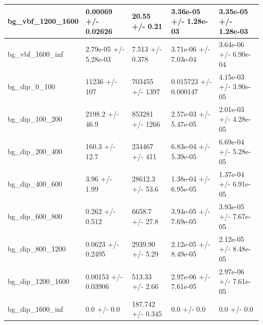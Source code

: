 \documentclass[a4paper, 10pt]{article}
\begin{document}
\begin{table}[H]
\begin{center}
\begin{tabular}{|m{20.0mm}|m{27.0mm}|m{27.0mm}|m{33.0mm}|m{32.0mm}|}
      \hline
      {\cellcolor{white}         bg\_vbf\_1200\_1600}& {\cellcolor{white}         0.00069 +/\-- 0.02626}& {\cellcolor{white}         20.55 +/\-- 0.21}& {\cellcolor{white}         3.36e-05 +/\-- 1.28e-03}& {\cellcolor{white}         3.35e-05 +/\-- 1.28e-03}\\
      \hline
      {\cellcolor{white}         bg\_vbf\_1600\_inf}& {\cellcolor{white}         2.79e-05 +/\-- 5.28e-03}& {\cellcolor{white}         7.513 +/\-- 0.378}& {\cellcolor{white}         3.71e-06 +/\-- 7.03e-04}& {\cellcolor{white}         3.64e-06 +/\-- 6.90e-04}\\
      \hline
      {\cellcolor{white}         bg\_dip\_0\_100}& {\cellcolor{white}         11236 +/\-- 107}& {\cellcolor{white}         703455 +/\-- 1397}& {\cellcolor{white}         0.015723 +/\-- 0.000147}& {\cellcolor{white}         4.15e-03 +/\-- 3.90e-05}\\
      \hline
      {\cellcolor{white}         bg\_dip\_100\_200}& {\cellcolor{white}         2198.2 +/\-- 46.9}& {\cellcolor{white}         853281 +/\-- 1266}& {\cellcolor{white}         2.57e-03 +/\-- 5.47e-05}& {\cellcolor{white}         2.01e-03 +/\-- 4.28e-05}\\
      \hline
      {\cellcolor{white}         bg\_dip\_200\_400}& {\cellcolor{white}         160.3 +/\-- 12.7}& {\cellcolor{white}         234467 +/\-- 411}& {\cellcolor{white}         6.83e-04 +/\-- 5.39e-05}& {\cellcolor{white}         6.69e-04 +/\-- 5.28e-05}\\
      \hline
      {\cellcolor{white}         bg\_dip\_400\_600}& {\cellcolor{white}         3.96 +/\-- 1.99}& {\cellcolor{white}         28612.3 +/\-- 53.6}& {\cellcolor{white}         1.38e-04 +/\-- 6.95e-05}& {\cellcolor{white}         1.37e-04 +/\-- 6.91e-05}\\
      \hline
      {\cellcolor{white}         bg\_dip\_600\_800}& {\cellcolor{white}         0.262 +/\-- 0.512}& {\cellcolor{white}         6658.7 +/\-- 27.8}& {\cellcolor{white}         3.94e-05 +/\-- 7.69e-05}& {\cellcolor{white}         3.93e-05 +/\-- 7.67e-05}\\
      \hline
      {\cellcolor{white}         bg\_dip\_800\_1200}& {\cellcolor{white}         0.0623 +/\-- 0.2495}& {\cellcolor{white}         2939.90 +/\-- 5.29}& {\cellcolor{white}         2.12e-05 +/\-- 8.49e-05}& {\cellcolor{white}         2.12e-05 +/\-- 8.48e-05}\\
      \hline
      {\cellcolor{white}         bg\_dip\_1200\_1600}& {\cellcolor{white}         0.00153 +/\-- 0.03906}& {\cellcolor{white}         513.33 +/\-- 2.66}& {\cellcolor{white}         2.97e-06 +/\-- 7.61e-05}& {\cellcolor{white}         2.97e-06 +/\-- 7.61e-05}\\
      \hline
      {\cellcolor{white}         bg\_dip\_1600\_inf}& {\cellcolor{white}         0.0 +/\-- 0.0}& {\cellcolor{white}         187.742 +/\-- 0.345}& {\cellcolor{white}         0.0 +/\-- 0.0}& {\cellcolor{white}         0.0 +/\-- 0.0}\\
\hline
    \end{tabular}
  \end{center}
\end{table}
\end{document}
